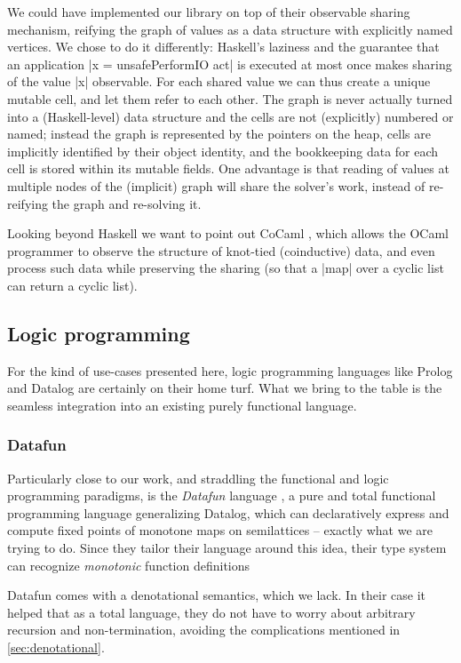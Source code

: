 \documentclass[manuscript,screen,acmsmall,nonacm]{acmart}
\begin{document}
We could have implemented our library on top of their observable sharing mechanism, reifying the graph of values as a data structure with explicitly named vertices. We chose to do it differently: Haskell's laziness and the guarantee that an application |x = unsafePerformIO act| is executed at most once makes sharing of the value |x| observable. For each shared value we can thus create a unique mutable cell, and let them refer to each other.
The graph is never actually turned into a (Haskell-level) data structure and the cells are not (explicitly) numbered or named; instead the graph is represented by the pointers on the heap, cells are implicitly identified by their object identity, and the bookkeeping data for each cell is stored within its mutable fields. One advantage is that reading of values at multiple nodes of the (implicit) graph will share the solver's work, instead of re-reifying the graph and re-solving it.

Looking beyond Haskell we want to point out CoCaml \citep{cocaml}, which allows the OCaml programmer to observe the structure of knot-tied (coinductive) data, and even process such data while preserving the sharing (so that a |map| over a cyclic list can return a cyclic list).


\subsection{Logic programming}

For the kind of use-cases presented here, logic programming languages like Prolog and Datalog are certainly on their home turf. What we bring to the table is the seamless integration into an existing purely functional language.

\subsubsection{Datafun}

Particularly close to our work, and straddling the functional and logic programming paradigms, is the \emph{Datafun} language \citep{datafun}, a pure and total functional programming language generalizing Datalog, which can declaratively express and compute fixed points of monotone maps on semilattices -- exactly what we are trying to do. Since they tailor their language around this idea, their type system can recognize \emph{monotonic} function definitions

Datafun comes with a denotational semantics, which we lack. In their case it helped that as a total language, they do not have to worry about arbitrary recursion and non-termination, avoiding the complications mentioned in \cref{sec:denotational}.
\end{document}
